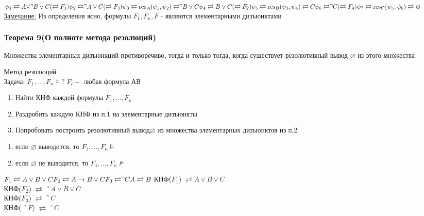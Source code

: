 \documentclass[12pt]{article}
\begin{document}
    \begin{math}
        \psi_1 \rightleftarrows A \vee \urcorner B \vee C (\rightleftarrows F_1)\\
        \psi_2 \rightleftarrows \urcorner A \vee C (\rightleftarrows F_3)\\
        \psi_3 \rightleftarrows \text{res}_A (\psi_1,\psi_2) \rightleftarrows \urcorner B \vee C\\
        \psi_4 \rightleftarrows B \vee C (\rightleftarrows F_2)\\
        \psi_5 \rightleftarrows \text{res}_B(\psi_3,\psi_4) \rightleftarrows C\\
        \psi_6 \rightleftarrows \urcorner C (\rightleftarrows F_4)\\
        \psi_7 \rightleftarrows \text{res}_C(\psi_5,\psi_6)\rightleftarrows \varnothing
    \end{math}
    \underline{Замечание:} Из определения ясно, формулы $F_1,F_n, F$ - являются элементарными дизъюнктами\\
    \subsubsection*{Теорема 9(О полноте метода резолюций)}\label{th:7.9}
    Множества элементарных дизъюнкций противоречиво, тогда и только тогда, когда существует резолютивный вывод 
    $\varnothing$ из этого множества\par\noindent
    \underline{Метод резолюций}\\
    Задача: $F_1,\dots,F_n \models ? \; F_i - $ любая формула АВ\\
    \begin{enumerate}
        \item Найти КНФ каждой формулы $F_1,\dots,F_n$
        \item Раздробить каждую КНФ из п.1 на элементарные дизъюнкты
        \item Попробовать построить резолютивный вывод$\varnothing$ из множества элементарных дизъюнктов из п.2
    \end{enumerate}
    
    \begin{enumerate}
        \item если $\varnothing$ выводится, то $F_1,\dots,F_n \models$
        \item если $\varnothing$ не выводится, то $F_1,\dots,F_n \not \models$
    \end{enumerate}

    \begin{math}
        F_1 \rightleftarrows A \vee B \vee C \\
        F_2 \rightleftarrows A \rightarrow B \vee C \\
        F_3 \rightleftarrows \urcorner C\\
        A \rightleftarrows B
    \end{math}
    КНФ($F_1$) $\rightleftarrows A \vee B \vee C$\\
    КНФ($F_2$) $\rightleftarrows \urcorner A \vee B \vee C$\\
    КНФ($F_3$) $\rightleftarrows \urcorner C$\\
    КНФ($\urcorner F$) $\rightleftarrows \urcorner C$\\
\end{document}
